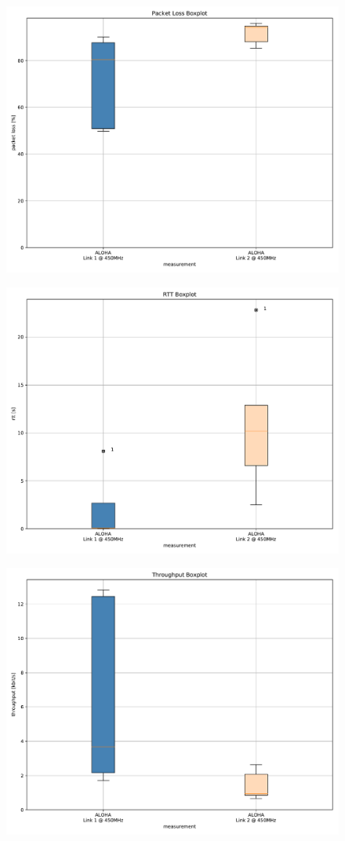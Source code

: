 \documentclass{article}
\begin{document}
\begin{figure}
	\includegraphics[width=\textwidth]{aloha_dual/boxplot/packet_loss_boxplot}
\end{figure}

\begin{figure}
	\includegraphics[width=\textwidth]{aloha_dual/boxplot/rtt_boxplot}
\end{figure}

\begin{figure}
	\includegraphics[width=\textwidth]{aloha_dual/boxplot/throughput_boxplot}
\end{figure}
\end{document}
